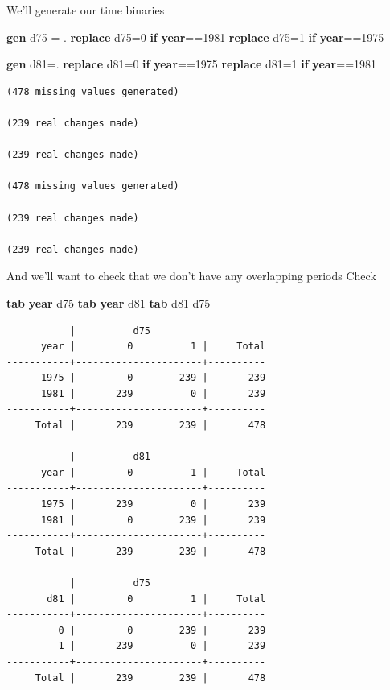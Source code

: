 \documentclass[
]{book}
\newenvironment{Shaded}{\begin{snugshade}}{\end{snugshade}}
\newcommand{\FunctionTok}[1]{\textcolor[rgb]{0.13,0.29,0.53}{\textbf{#1}}}
\newcommand{\KeywordTok}[1]{\textcolor[rgb]{0.13,0.29,0.53}{\textbf{#1}}}
\newcommand{\NormalTok}[1]{#1}
\begin{document}
We'll generate our time binaries

\begin{Shaded}
\begin{Highlighting}[]
\KeywordTok{gen}\NormalTok{ d75 = .}
\KeywordTok{replace}\NormalTok{ d75=0 }\KeywordTok{if} \FunctionTok{year}\NormalTok{==1981}
\KeywordTok{replace}\NormalTok{ d75=1 }\KeywordTok{if} \FunctionTok{year}\NormalTok{==1975}

\KeywordTok{gen}\NormalTok{ d81=.}
\KeywordTok{replace}\NormalTok{ d81=0 }\KeywordTok{if} \FunctionTok{year}\NormalTok{==1975}
\KeywordTok{replace}\NormalTok{ d81=1 }\KeywordTok{if} \FunctionTok{year}\NormalTok{==1981}
\end{Highlighting}
\end{Shaded}

\begin{verbatim}
(478 missing values generated)

(239 real changes made)

(239 real changes made)

(478 missing values generated)

(239 real changes made)

(239 real changes made)
\end{verbatim}

And we'll want to check that we don't have any overlapping periods
Check

\begin{Shaded}
\begin{Highlighting}[]
\KeywordTok{tab} \FunctionTok{year}\NormalTok{ d75}
\KeywordTok{tab} \FunctionTok{year}\NormalTok{ d81}
\KeywordTok{tab}\NormalTok{ d81 d75}
\end{Highlighting}
\end{Shaded}

\begin{verbatim}
           |          d75
      year |         0          1 |     Total
-----------+----------------------+----------
      1975 |         0        239 |       239 
      1981 |       239          0 |       239 
-----------+----------------------+----------
     Total |       239        239 |       478 

           |          d81
      year |         0          1 |     Total
-----------+----------------------+----------
      1975 |       239          0 |       239 
      1981 |         0        239 |       239 
-----------+----------------------+----------
     Total |       239        239 |       478 

           |          d75
       d81 |         0          1 |     Total
-----------+----------------------+----------
         0 |         0        239 |       239 
         1 |       239          0 |       239 
-----------+----------------------+----------
     Total |       239        239 |       478 
\end{verbatim}
\end{document}
